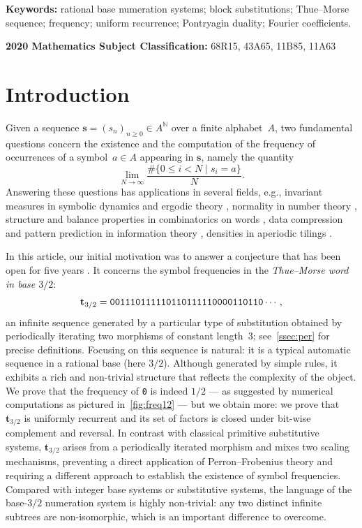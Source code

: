 \documentclass[12pt,reqno]{article}
\begin{document}
\bigskip
\noindent\textbf{Keywords:} rational base numeration systems; block substitutions; Thue--Morse sequence;  frequency;  uniform recurrence; Pontryagin duality; Fourier coefficients.

\bigskip

\noindent\textbf{2020 Mathematics Subject Classification:} 68R15, 43A65, 11B85, 11A63

\section{Introduction}
\label{sec:intro}

Given a sequence $\mathbf{s}=(s_n)_{n\ge 0}\in A^{\mathbb{N}}$ over a finite alphabet~$A$, two fundamental questions concern the existence and the computation of the frequency of occurrences of a symbol~$a\in A$ appearing in $\mathbf{s}$, namely  the quantity
\[
  \lim_{N\to \infty} \frac{\# \{ 0\le i<N \mid s_i=a\}}{N}.
\]
Answering these questions has applications in several fields,  e.g.,  invariant measures in symbolic dynamics and ergodic theory \cite{MorseHedlund,Queffelec}, normality in number theory \cite{Becher,SGNT}, structure and balance properties in combinatorics on words \cite{Adamczewski,Lothaire2,MorseHedlund2}, data compression and pattern prediction in information theory \cite{1096090}, densities in aperiodic tilings \cite{BaakeGrimm}.

In this article, our initial motivation was to answer a conjecture that has been open for five years \cite{RigSti1}. It concerns the symbol frequencies in the {\em Thue--Morse word in base $3/2$}:
\begin{equation}\label{eq:t32}
  \mathbf{t}_{3/2}={\tt 001110111110110111110000110110}\cdots,
\end{equation}
an infinite sequence generated by a particular type of substitution obtained by periodically iterating two morphisms of constant length~$3$; see~\cref{ssec:per} for precise definitions. Focusing on this sequence is natural: it is a typical automatic sequence in a rational base (here $3/2$).  Although generated by simple rules, it exhibits a rich and non-trivial structure that reflects the complexity of the object.  We prove that the frequency of {\tt 0} is indeed $1/2$ --- as suggested by numerical computations as pictured in~\cref{fig:freq12} --- but we obtain more: we prove that $\mathbf{t}_{3/2}$ is uniformly recurrent and its set of factors is closed under bit-wise complement and reversal. In contrast with classical primitive substitutive systems, $\mathbf{t}_{3/2}$ arises from a periodically iterated morphism and mixes two scaling mechanisms, preventing a direct application of Perron--Frobenius theory and requiring a different approach to establish the existence of symbol frequencies. Compared with integer base systems or substitutive systems, the language of the base-$3/2$ numeration system is highly non-trivial: any two distinct infinite subtrees are non-isomorphic, which is an important difference to overcome.
\end{document}
